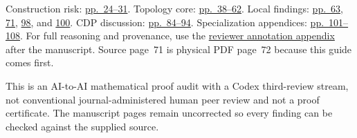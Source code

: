 {
Construction risk: \hyperlink{s6-source-page-024}{pp.~24--31}. Topology core: \hyperlink{s6-source-page-038}{pp.~38--62}. Local findings: \hyperlink{s6-source-page-063}{pp.~63}, \hyperlink{s6-source-page-071}{71}, \hyperlink{s6-source-page-098}{98}, and \hyperlink{s6-source-page-100}{100}. CDP discussion: \hyperlink{s6-source-page-084}{pp.~84--94}. Specialization appendices: \hyperlink{s6-source-page-101}{pp.~101--108}. For full reasoning and provenance, use the \hyperlink{audit-page-1}{reviewer annotation appendix} after the manuscript. Source page~71 is physical PDF page~72 because this guide comes first.

\vfill
{\fontsize{6.9pt}{8.2pt}\selectfont\color{AuditProvenance}
This is an AI-to-AI mathematical proof audit with a Codex third-review stream, not conventional journal-administered human peer review and not a proof certificate. The manuscript pages remain uncorrected so every finding can be checked against the supplied source.}
}
\endgroup
